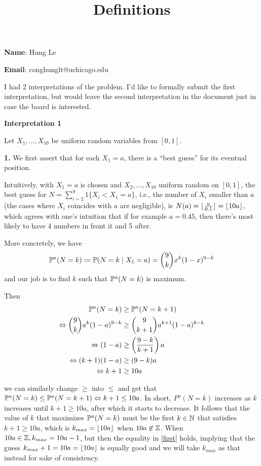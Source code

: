\documentclass[a4paper, 10pt]{article}
\title{Definitions}
\begin{document}
\textbf{Name}: Hung Le

\textbf{Email}: conghunglt@uchicago.edu

I had 2 interpretations of the problem. I'd like to formally submit the first interpretation, but would leave the second interpretation in the document just in case the board is interested.

\textbf{Interpretation 1}

Let $X_1, \dots, X_{10}$ be uniform random variables from $[0, 1]$.

\textbf{1.} We first assert that for each $X_1 = a$, there is a ``best guess'' for its eventual position.

Intuitively, with $X_1 = a$ is chosen and $X_2, \dots, X_{10}$ uniform random on $[0, 1]$, the best guess for $N = \sum_{i = 2}^{9} 1\{X_i < X_1 = a\}$, i.e., the number of $X_i$ smaller than $a$ (the cases where $X_i$ coincides with $a$ are negligible), is $N(a) = \lfloor\frac{a}{0.1}\rfloor = \lfloor10a\rfloor$, which agrees with one's intuition that if for example $a = 0.45$, then there's most likely to have 4 numbers in front it and 5 after.

More concretely, we have \[
\mathbb{P}^a (N = k) \coloneqq \mathbb{P}(N = k \mid X_1 = a) = \binom{9}{k} x^k (1-x)^{9-k}
\]
and our job is to find $k$ such that $\mathbb{P}^a(N=k)$ is maximum.

Then \begin{equation} \label{first}
    \begin{aligned}
        \mathbb{P}^a(N= k) &\geq \mathbb{P}^a(N=k+1) \\
        \Leftrightarrow \binom{9}{k}a^k (1-a)^{9-k} & \geq \binom{9}{k+1}a^{k+1}(1-a)^{8-k} \\
        \Leftrightarrow (1-a) & \geq \left(\frac{9-k}{k+1}\right) a \\
        \Leftrightarrow (k+1)(1-a) & \geq (9-k)a \\
        \Leftrightarrow k+1 & \geq 10a
    \end{aligned}
\end{equation}

we can similarly change $\geq$ into $\leq$ and get that $\mathbb{P}^a(N= k) \leq \mathbb{P}^a(N = k+1) \Leftrightarrow k+1 \leq 10a$. In short, $P^a(N=k)$ increases as $k$ increases until $k+1 \geq 10a$, after which it starts to decrease. It follows that the value of $k$ that maximizes $\mathbb{P}^a(N=k)$ must be the first $k \in \mathbb{N}$ that satisfies $k + 1 \geq 10a$, which is $k_{max} = \lfloor10a\rfloor$ when $10a \not \in \mathbb{Z}$. When $10a \in \mathbb{Z}, k_{max} = 10a - 1$, but then the equality in \eqref{first} holds, implying that the guess $k_{max} + 1 = 10a = \lfloor10a\rfloor$ is equally good and we will take $k_{max}$ as that instead for sake of consistency.
\end{document}
